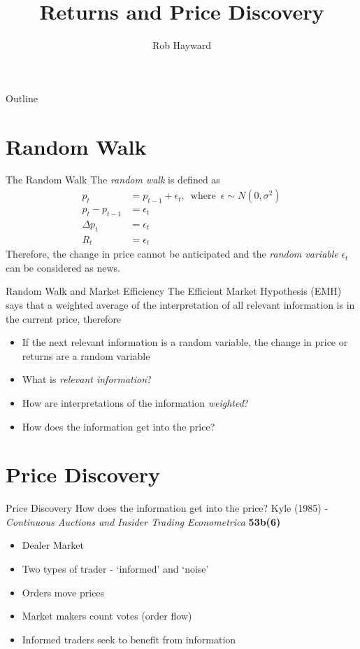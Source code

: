 \documentclass[14pt,xcolor=pdftex,dvipsnames,table]{beamer}
\title{Returns and Price Discovery}
\author{Rob Hayward}
\begin{document}
\begin{frame}
\titlepage
\end{frame}

\begin{frame}{Outline}
\tableofcontents
\end{frame}

\section{Random Walk}
\begin{frame}{The Random Walk}
The \emph{random walk} is defined as 
\begin{align*}
p_t &= p_{t-1} + \epsilon_t,  \hspace{6pt} \text{where} \hspace{6pt}  \epsilon \sim N(0, \sigma^2)\\
p_t - p_{t-1} &= \epsilon_t\\
\Delta p_t &= \epsilon_t\\
R_t &= \epsilon_t
\end{align*}
Therefore, the change in price cannot be anticipated and the \emph{random variable} $\epsilon_t$ can be considered as news. 
\end{frame}

\begin{frame}{Random Walk and Market Efficiency}
The Efficient Market Hypothesis (EMH) says that a weighted average of the interpretation of all relevant information is in the current price, therefore
\pause
\begin{itemize}[<+-| alert@+>]
\item If the next relevant information is a random variable, the change in price or returns are a random variable
\item What is \emph{relevant information}? 
\item How are interpretations of the information \emph{weighted}? 
\item How does the information get into the price? 
\end{itemize}
\end{frame}

\section{Price Discovery}
\begin{frame}{Price Discovery}
How does the information get into the price? 
\pause
Kyle (1985) - \emph{Continuous Auctions and Insider Trading} \emph{Econometrica} \textbf{53b(6)}
\pause
\begin{itemize}[<+-| alert@+>]
\item Dealer Market
\item Two types of trader - `informed' and `noise'
\item Orders move prices
\item Market makers count votes (order flow)
\item Informed traders seek to benefit from information
\end{itemize}
\end{frame}
\end{document}
